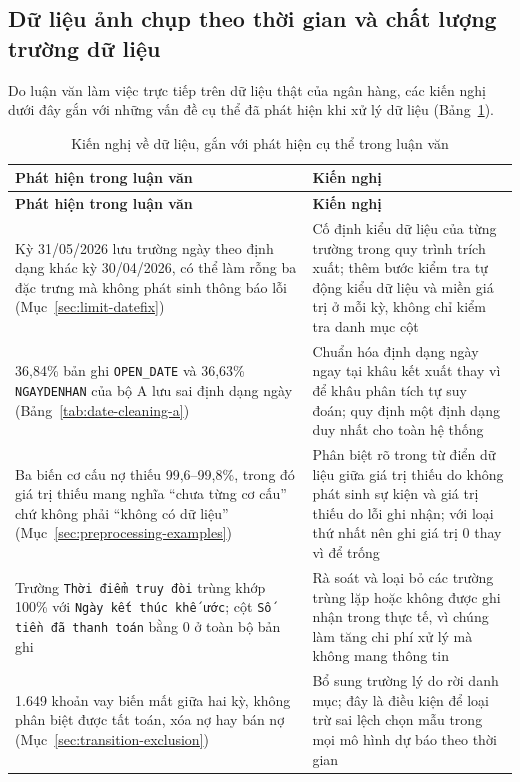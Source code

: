 \subsection{Dữ liệu ảnh chụp theo thời gian và chất lượng trường dữ liệu}

Do luận văn làm việc trực tiếp trên dữ liệu thật của ngân hàng, các kiến nghị dưới đây gắn với những vấn đề cụ thể đã phát hiện khi xử lý dữ liệu (Bảng~\ref{tab:recommend-data}).

\begin{longtable}{|p{6.0cm}|p{7.4cm}|}
\caption{Kiến nghị về dữ liệu, gắn với phát hiện cụ thể trong luận văn}
\label{tab:recommend-data}\\
\hline
\textbf{Phát hiện trong luận văn} & \textbf{Kiến nghị}\\
\hline
\endfirsthead
\hline
\textbf{Phát hiện trong luận văn} & \textbf{Kiến nghị}\\
\hline
\endhead
Kỳ 31/05/2026 lưu trường ngày theo định dạng khác kỳ 30/04/2026, có thể làm rỗng ba đặc trưng mà không phát sinh thông báo lỗi (Mục~\ref{sec:limit-datefix}) & Cố định kiểu dữ liệu của từng trường trong quy trình trích xuất; thêm bước kiểm tra tự động kiểu dữ liệu và miền giá trị ở mỗi kỳ, không chỉ kiểm tra danh mục cột\\
\hline
36,84\% bản ghi \mbox{\texttt{OPEN\_DATE}} và 36,63\% \mbox{\texttt{NGAYDENHAN}} của bộ A lưu sai định dạng ngày (Bảng~\ref{tab:date-cleaning-a}) & Chuẩn hóa định dạng ngày ngay tại khâu kết xuất thay vì để khâu phân tích tự suy đoán; quy định một định dạng duy nhất cho toàn hệ thống\\
\hline
Ba biến cơ cấu nợ thiếu 99,6--99,8\%, trong đó giá trị thiếu mang nghĩa ``chưa từng cơ cấu'' chứ không phải ``không có dữ liệu'' (Mục~\ref{sec:preprocessing-examples}) & Phân biệt rõ trong từ điển dữ liệu giữa giá trị thiếu do không phát sinh sự kiện và giá trị thiếu do lỗi ghi nhận; với loại thứ nhất nên ghi giá trị 0 thay vì để trống\\
\hline
Trường \texttt{Thời điểm truy đòi} trùng khớp 100\% với \texttt{Ngày kết thúc khế ước}; cột \texttt{Số tiền đã thanh toán} bằng 0 ở toàn bộ bản ghi & Rà soát và loại bỏ các trường trùng lặp hoặc không được ghi nhận trong thực tế, vì chúng làm tăng chi phí xử lý mà không mang thông tin\\
\hline
1.649 khoản vay biến mất giữa hai kỳ, không phân biệt được tất toán, xóa nợ hay bán nợ (Mục~\ref{sec:transition-exclusion}) & Bổ sung trường lý do rời danh mục; đây là điều kiện để loại trừ sai lệch chọn mẫu trong mọi mô hình dự báo theo thời gian\\

\end{longtable}
